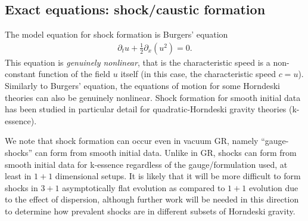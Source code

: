 \documentclass{ws-ijmpd}
\begin{document}
\subsection{Exact equations: shock/caustic formation
\label{sec:shock_formation}
}
The model equation for shock formation is Burgers' 
equation\cite{bateman_burgers,BURGERS1948171}
\begin{align}
   \label{eq:burgers_eqn}
   \partial_tu
   +
   \frac{1}{2}\partial_x\left(u^2\right)
   =
   0
   .
\end{align}
This equation is \emph{genuinely nonlinear}, that is the
characteristic speed is a non-constant function of
the field $u$ itself\cite{whitham2011linear,
alcubierre2008introduction,evans2010partial,rezzolla2013relativistic}
(in this case, the characteristic speed $c=u$).
Similarly to Burgers' equation, the equations of motion for
some Horndeski theories 
can also be genuinely nonlinear\cite{Tanahashi:2017kgn}. 
Shock formation for smooth initial data has been studied in particular detail for
quadratic-Horndeski gravity 
theories (k-essence)\cite{Felder:2002sv,Babichev:2016hys,
Pasmatsiou:2017vcw,Bezares:2020wkn}.

We note that shock formation can occur even
in vacuum GR, namely ``gauge-shocks'' can form from smooth initial
data\cite{Alcubierre:1996su,Alcubierre:1997ee,Alcubierre:2002iq,Reimann:2004wp}.
Unlike in GR, shocks can form from smooth initial data for k-essence regardless
of the gauge/formulation used, at least
in $1+1$ dimensional setups\cite{Babichev:2016hys,Tanahashi:2017kgn}. 
It is likely that it will be more difficult 
to form shocks in $3+1$ asymptotically
flat evolution as compared to $1+1$ evolution 
due to the effect of dispersion,
although further work will be needed in this direction to determine
how prevalent shocks are in different subsets of Horndeski gravity.
\end{document}
